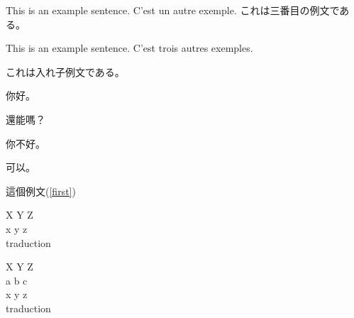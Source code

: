 \documentclass{article}
\begin{document}
\begin{exe}
    \ex This is an example sentence.
    \ex C'est un autre exemple.
    \ex これは三番目の例文である。
  \end{exe}

 \begin{exe}
    \ex\label{first} This is an example sentence.%
    \ex C'est trois autres exemples.
      \begin{xlist}%
        \ex これは入れ子例文である。
          \begin{xlist}%
            \ex 你好。
              \begin{xlistI}%
                \ex 還能嗎？
              \end{xlistI}
            \ex 你不好。
              \begin{xlistA}%
                \ex 可以。
              \end{xlistA}
          \end{xlist}  
      \end{xlist}
  \end{exe}
  這個例文(\ref{first})%



\begin{exe}
\gll X Y Z\\
x y z\\
\glt traduction
\end{exe}

\begin{exe}
\glll X Y Z\\
a b c\\
x y z\\
\glt traduction
\end{exe}
\end{document}

